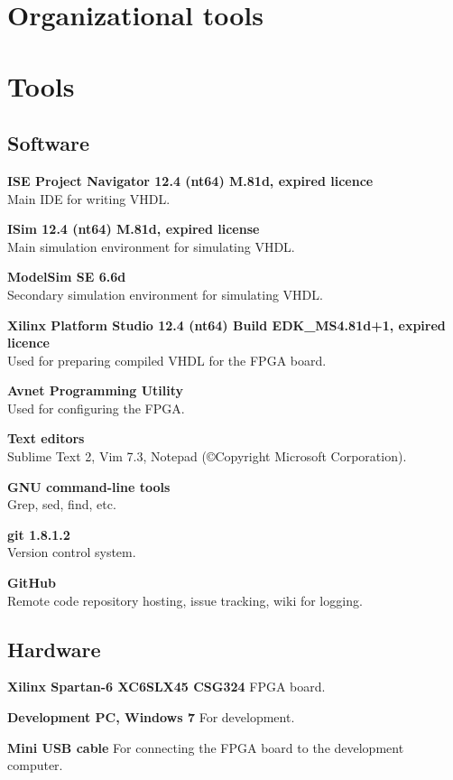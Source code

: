 \section{Organizational tools}


\section{Tools}


\subsection{Software}
\begin{description}
    \item{\textbf{ISE Project Navigator 12.4 (nt64) M.81d, expired licence}} \\
        Main IDE for writing VHDL.
    \item{\textbf{ISim 12.4 (nt64) M.81d, expired license}} \\
        Main simulation environment for simulating VHDL.
    \item{\textbf{ModelSim SE 6.6d}} \\
        Secondary simulation environment for simulating VHDL.
    \item{\textbf{Xilinx Platform Studio 12.4 (nt64) Build EDK\_MS4.81d+1, expired licence}} \\
        Used for preparing compiled VHDL for the FPGA board.
    \item{\textbf{Avnet Programming Utility}} \\
        Used for configuring the FPGA.
    \item{\textbf{Text editors}} \\
        Sublime Text 2, Vim 7.3, Notepad (©Copyright Microsoft Corporation).
    \item{\textbf{GNU command-line tools}} \\
        Grep, sed, find, etc.
    \item{\textbf{git 1.8.1.2}} \\
        Version control system.
    \item{\textbf{GitHub}} \\
        Remote code repository hosting, issue tracking, wiki for logging.
\end{description}

\subsection{Hardware}
\begin{description}
\item{\textbf{Xilinx Spartan-6 XC6SLX45 CSG324}}
    FPGA board.
\item{\textbf{Development PC, Windows 7}}
    For development.
\item{\textbf{Mini USB cable}}
    For connecting the FPGA board to the development computer.
\end{description}
